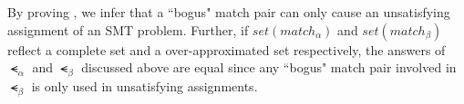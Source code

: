 By proving , we infer that a ``bogus" match pair can
only cause an unsatisfying assignment of an SMT problem. Further, if
$\mathit{set(match_{\alpha})}$ and $\mathit{set(match_{\beta})}$
reflect a complete set and a over-approximated set respectively, the
answers of $\smt_{\alpha}$ and $\smt_{\beta}$ discussed above are
equal since any ``bogus" match pair involved in $\smt_{\beta}$ is only
used in unsatisfying assignments.

